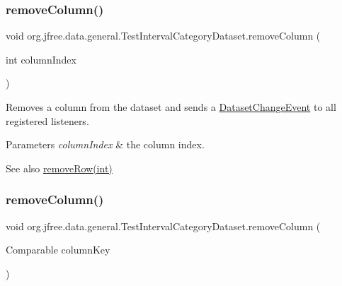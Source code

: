 \subsubsection{\texorpdfstring{remove\+Column()}{removeColumn()}\hspace{0.1cm}{\footnotesize\ttfamily [1/2]}}
{\footnotesize\ttfamily void org.\+jfree.\+data.\+general.\+Test\+Interval\+Category\+Dataset.\+remove\+Column (\begin{DoxyParamCaption}\item[{int}]{column\+Index }\end{DoxyParamCaption})}

Removes a column from the dataset and sends a \mbox{\hyperlink{classorg_1_1jfree_1_1data_1_1general_1_1_dataset_change_event}{Dataset\+Change\+Event}} to all registered listeners.


\begin{DoxyParams}{Parameters}
{\em column\+Index} & the column index.\\
\hline
\end{DoxyParams}
\begin{DoxySeeAlso}{See also}
\mbox{\hyperlink{classorg_1_1jfree_1_1data_1_1general_1_1_test_interval_category_dataset_a403f2f5d4fd89770e090526150d10e5a}{remove\+Row(int)}} 
\end{DoxySeeAlso}
\mbox{\label{classorg_1_1jfree_1_1data_1_1general_1_1_test_interval_category_dataset_aaac9deaaa8f4e8da7c6b15a0cc31b959}} 
\subsubsection{\texorpdfstring{remove\+Column()}{removeColumn()}\hspace{0.1cm}{\footnotesize\ttfamily [2/2]}}
{\footnotesize\ttfamily void org.\+jfree.\+data.\+general.\+Test\+Interval\+Category\+Dataset.\+remove\+Column (\begin{DoxyParamCaption}\item[{Comparable}]{column\+Key }\end{DoxyParamCaption})}

